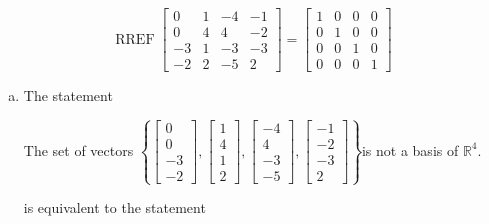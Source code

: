 \begin{exerciseAnswer} 


\[\operatorname{RREF} \left[\begin{array}{cccc}
0 & 1 & -4 & -1 \\
0 & 4 & 4 & -2 \\
-3 & 1 & -3 & -3 \\
-2 & 2 & -5 & 2
\end{array}\right] = \left[\begin{array}{cccc}
1 & 0 & 0 & 0 \\
0 & 1 & 0 & 0 \\
0 & 0 & 1 & 0 \\
0 & 0 & 0 & 1
\end{array}\right] \]


\begin{enumerate}[(a)]
\item The statement 
\begin{center}\begin{minipage}{0.8\textwidth}
 The set of vectors \( \left\{ \left[\begin{array}{c}
0 \\
0 \\
-3 \\
-2
\end{array}\right] , \left[\begin{array}{c}
1 \\
4 \\
1 \\
2
\end{array}\right] , \left[\begin{array}{c}
-4 \\
4 \\
-3 \\
-5
\end{array}\right] , \left[\begin{array}{c}
-1 \\
-2 \\
-3 \\
2
\end{array}\right] \right\} \)is not a basis of \(\mathbb{R}^4\). 
\end{minipage}\end{center}
     is equivalent to the statement 
\begin{center}\begin{minipage}{0.8\textwidth}
 The set of vectors \( \left\{ \left[\begin{array}{c}
0 \\
0 \\

\end{array}
\end{minipage}
\end{center}
\end{enumerate}
\end{exerciseAnswer}
